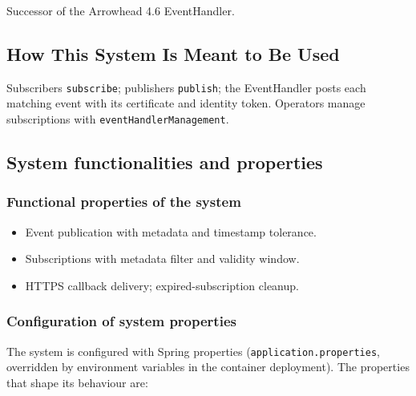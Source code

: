 \documentclass[a4paper]{arrowhead}
\begin{document}
Successor of the Arrowhead 4.6 EventHandler.

\subsection{How This System Is Meant to Be Used}
\label{sec:use}

Subscribers \texttt{subscribe}; publishers \texttt{publish}; the EventHandler posts each matching event with its certificate and identity token. Operators manage subscriptions with \texttt{event\allowbreak{}Handler\allowbreak{}Management}.

\subsection{System functionalities and properties}
\label{sec:properties}

\subsubsection{Functional properties of the system}

\begin{itemize}
  \item Event publication with metadata and timestamp tolerance.
  \item Subscriptions with metadata filter and validity window.
  \item HTTPS callback delivery; expired-subscription cleanup.
\end{itemize}

\subsubsection{Configuration of system properties}

The system is configured with Spring properties (\texttt{application.properties}, overridden by environment variables in the container deployment). The properties that shape its behaviour are:
\end{document}
